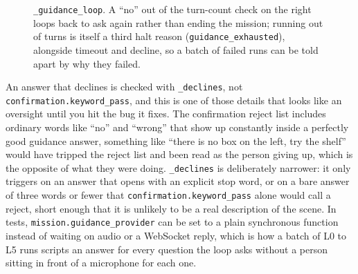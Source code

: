 \begin{figure}[htbp]
  \centering
  \caption{\texttt{\_guidance\_loop}. A ``no'' out of the turn-count check on the right loops back to ask again rather than ending the mission; running out of turns is itself a third halt reason (\texttt{guidance\_exhausted}), alongside timeout and decline, so a batch of failed runs can be told apart by why they failed.}
  \label{fig:flow-guidance}
\end{figure}
An answer that declines is checked with \texttt{\_declines}, not
\texttt{confirmation.keyword\_pass}, and this is one of those details that
looks like an oversight until you hit the bug it fixes. The confirmation
reject list includes ordinary words like ``no'' and ``wrong'' that show up
constantly inside a perfectly good guidance answer, something like ``there
is no box on the left, try the shelf'' would have tripped the reject list
and been read as the person giving up, which is the opposite of what they
were doing. \texttt{\_declines} is deliberately narrower: it only triggers
on an answer that opens with an explicit stop word, or on a bare answer of
three words or fewer that \texttt{confirmation.keyword\_pass} alone would
call a reject, short enough that it is unlikely to be a real description of
the scene. In tests, \texttt{mission.guidance\_provider} can be set to a
plain synchronous function instead of waiting on audio or a WebSocket
reply, which is how a batch of L0 to L5 runs scripts an answer for every
question the loop asks without a person sitting in front of a microphone
for each one.

